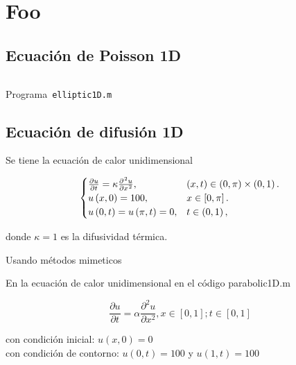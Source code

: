 \documentclass[a4paper,abstract=true]{scrreprt}
\begin{document}
\chapter{Foo}

\section{Ecuación de Poisson 1D}

\begin{listing}[ht!]
    \tiny
    \centering
    \inputminted[frame=single,framesep=10pt,linenos,firstline=1,lastline=53,highlightlines={21,29}]{octave}{../examples/octave/elliptic1D.m}
    \caption{Programa~\texttt{elliptic1D.m}}
    \label{code:elliptic1D.m}
\end{listing}

\section{Ecuación de difusión 1D}
Se tiene la ecuación de calor unidimensional

\begin{equation}\label{eq:IBVPheat1d}
    \begin{cases}
        \diffp{u}{t}=
        \kappa\diffp[2]{u}{x},
         & \left(x,t\right)\in
        \left(0,\pi\right)\times\left(0,1\right). \\
        u\left(x,0\right)=
        100,
         & x\in
        \left[0,\pi\right].                       \\
        u\left(0,t\right)=
        u\left(\pi,t\right)=0,
         & t\in
        \left(0,1\right),
    \end{cases}
\end{equation}

donde $\kappa=1$ es la difusividad térmica.

Usando métodos mimeticos

En  la ecuación de calor unidimensional en el código parabolic1D.m

\begin{equation}
	\frac{\partial u}{\partial t} = \alpha \frac{\partial^{2} u}{\partial x^{2}},   x \in [0,1] ; t \in [0,1]
\end{equation}

con condición inicial: $u(x,0) = 0$\\

con condición de contorno: $u(0,t)= 100$ y $u(1,t) =100$\\
\end{document}
